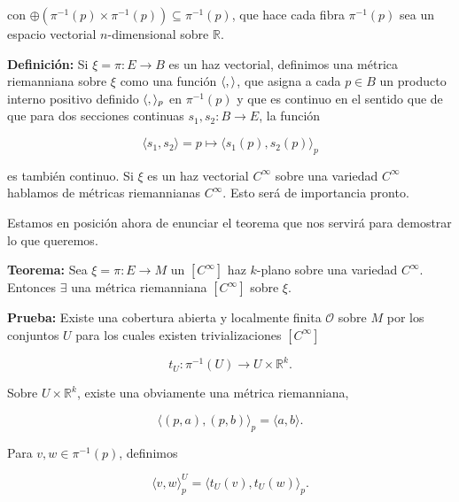 \documentclass[a4paper,10pt]{article}
\numberwithin{equation}{section}
\newcommand{\definicion}{\textbf{Definición: }}
\newcommand{\teorema}{\textbf{Teorema: }}
\newcommand{\prueba}{\textbf{Prueba: }}
\begin{document}
con $\oplus(\pi^{-1}(p) \times \pi^{-1}(p)) \subseteq \pi^{-1}(p)$, que hace 
cada fibra $\pi^{-1}(p)$ sea un espacio vectorial $n$-dimensional sobre 
$\mathbb{R}$.

\definicion Si $\xi = \pi: E \rightarrow B$ es un haz vectorial, definimos 
una métrica riemanniana sobre $\xi$ como una función $\langle \space, \space \rangle$, 
que asigna a cada $p \in B$ un producto interno positivo definido $\langle \space, \space \rangle_p$
en $\pi^{-1}(p)$ y que es continuo en el sentido que de que para dos secciones continuas 
$s_1,s_2: B \rightarrow E$, la función

\begin{equation}
 \langle s_1, s_2 \rangle = p \mapsto \langle s_1(p), s_2(p) \rangle_p
\end{equation}

es también continuo. Si $\xi$ es un haz vectorial $C^\infty$ sobre una variedad 
$C^\infty$ hablamos de métricas riemannianas $C^\infty$. Esto será de importancia pronto.

\vspace{.3cm}

Estamos en posición ahora de enunciar el teorema que nos servirá para 
demostrar lo que queremos.

\vspace{.3cm}

\teorema Sea $\xi = \pi: E \rightarrow M$ un $[C^\infty]$ haz $k$-plano
sobre una variedad $C^\infty$. Entonces $\exists$ una métrica riemanniana 
$[C^\infty]$ sobre $\xi$.

\vspace{.3cm}

\prueba Existe una cobertura abierta y localmente finita $\mathcal{O}$ sobre 
$M$ por los conjuntos $U$ para los cuales existen trivializaciones $[C^\infty]$

\begin{equation}
 t_U: \pi^{-1}(U) \rightarrow U \times \mathbb{R}^k.
\end{equation}

Sobre $U \times \mathbb{R}^k$, existe una obviamente una métrica riemanniana,

\begin{equation}
 \langle (p,a), (p,b)\rangle_p = \langle a, b \rangle. 
\end{equation}

Para $v,w \in \pi^{-1}(p)$, definimos

\begin{equation}
 \langle v, w \rangle_p^U = \langle t_U(v),t_U(w)\rangle_p.
\end{equation}
\end{document}

